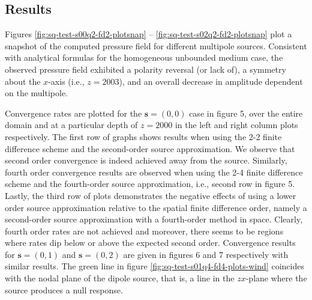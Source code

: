 \subsection{Results}


Figures \ref{fig:sq-test-s00q2-fd2-plotsnap} -- \ref{fig:sq-test-s02q2-fd2-plotsnap} 
plot a snapshot of the computed pressure field for different multipole sources.
Consistent with analytical formulas for the homogeneous unbounded medium case, 
the observed pressure field exhibited a polarity reversal (or lack of), a symmetry about the $x$-axis (i.e., $z=2003$), and an overall decrease in amplitude dependent on the multipole.


Convergence rates are plotted for the $\mathbf s=(0,0)$ case in figure 5, 
over the entire domain and at a particular depth of $z=2000$ in the left and right column plots respectively.
The first row of graphs shows results when using the 2-2 finite difference scheme and the second-order source approximation.
We observe that second order convergence is indeed achieved away from the source.
Similarly, fourth order convergence results are observed when using the 2-4 finite difference scheme and the fourth-order source approximation, i.e., second row in figure 5.
Lastly, the third row of plots demonstrates the negative effects of using a lower order source approximation relative to the spatial finite difference order, namely a second-order source approximation with a fourth-order method in space.
Clearly, fourth order rates are not achieved and moreover, there seems to be regions 
where rates dip below or above the expected second order.
Convergence results for $\mathbf s=(0,1)$ and $\mathbf s=(0,2)$ are given in figures 6 and 7 respectively with similar results.
The green line in figure \ref{fig:sq-test-s01q4-fd4-plots-wind} coincides with the nodal plane of the dipole source, that is, a line in the $zx$-plane where the source produces a null response. 




